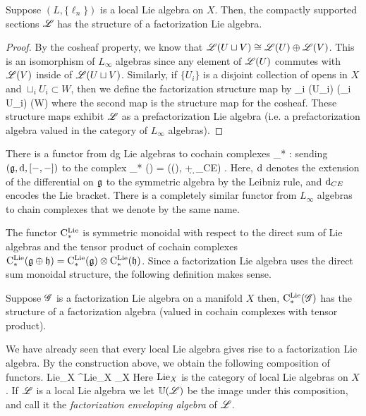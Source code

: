 \documentclass[10pt]{amsart}
\begin{document}
\begin{lem}
Suppose $(L, \{\ell_n\})$ is a local Lie algebra on $X$.
Then, the compactly supported sections $\mathscr L$ has the structure of a factorization Lie algebra.
\end{lem}
\begin{proof}
By the cosheaf property, we know that $\mathscr L(U \sqcup V) \cong \mathscr L(U) \oplus \mathscr L(V)$. 
This is an isomorphism of $L_\infty$ algebras since any element of $\mathscr L(U)$ commutes with $\mathscr L(V)$ inside of $\mathscr L(U \sqcup V)$. 
Similarly, if $\{U_i\}$ is a disjoint collection of opens in $X$ and $\sqcup_i U_i \subset W$, then we define the factorization structure map by
\ben
\oplus_i \sL(U_i) \cong \sL(\sqcup_i U_i) \to \sL (W)
\een
where the second map is the structure map for the cosheaf. 
These structure maps exhibit $\mathscr L$ as a prefactorization Lie algebra (i.e. a prefactorization algebra valued in the category of $L_\infty$ algebras). 
\end{proof}

There is a functor from dg Lie algebras to cochain complexes 
\ben
\clieu_* : \dgLie \to \Ch
\een
sending $(\mathfrak g, {\rm d} , [-,-])$ to the complex
\ben
\clieu_* (\fg) = \left(\Sym(\fg[1]), \d + \d_{CE}\right) .
\een
Here, ${\rm d}$ denotes the extension of the differential on $\mathfrak g$ to the symmetric algebra by the Leibniz rule, and ${\rm d}_{CE}$ encodes the Lie bracket.
There is a completely similar functor from $L_\infty$ algebras to chain complexes that we denote by the same name.

The functor ${\rm C}^{\rm Lie}_*$ is symmetric monoidal with respect to the direct sum of Lie algebras and the tensor product of cochain complexes ${\rm C}^{\rm Lie}_*(\mathfrak g \oplus \mathfrak h) = {\rm C}^{\rm Lie}_*(\mathfrak g) \otimes {\rm C}^{\rm Lie}_*(\mathfrak h)$. 
Since a factorization Lie algebra uses the direct sum monoidal structure, the following definition makes sense.

\begin{dfn/lem}
Suppose $\mathscr G$ is a factorization Lie algebra on a manifold $X$ then, ${\rm C}^{\rm Lie}_*(\mathscr G)$ has the structure of a factorization algebra (valued in cochain complexes with tensor product). 
\end{dfn/lem}

We have already seen that every local Lie algebra gives rise to a factorization Lie algebra.
By the construction above, we obtain the following composition of functors.
\ben
{\rm Lie}_X ^{\rm Lie}_X _X
\een
Here ${\rm Lie}_X$ is the category of local Lie algebras on $X$.
If $\mathscr L$ is a local Lie algebra we let $\mathbb U(\mathscr L)$ be the image under this composition, and call it the {\em factorization enveloping algebra} of $\mathscr L$. 
\end{document}

